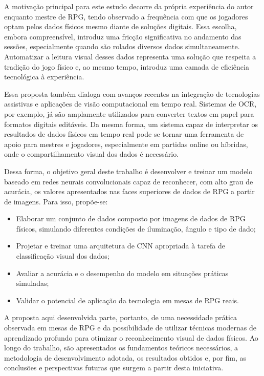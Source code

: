 A motivação principal para este estudo decorre da própria experiência do autor 
enquanto mestre de RPG, tendo observado a frequência com que os jogadores optam 
pelos dados físicos mesmo diante de soluções digitais. Essa escolha, embora compreensível, 
introduz uma fricção significativa no andamento das sessões, especialmente quando são 
rolados diversos dados simultaneamente. Automatizar a leitura visual desses dados 
representa uma solução que respeita a tradição do jogo físico e, ao mesmo tempo, 
introduz uma camada de eficiência tecnológica à experiência.

Essa proposta também dialoga com avanços recentes na integração de tecnologias 
assistivas e aplicações de visão computacional em tempo real. Sistemas de OCR, por 
exemplo, já são amplamente utilizados para converter textos em papel para formatos 
digitais editáveis. Da mesma forma, um sistema capaz de interpretar os resultados de 
dados físicos em tempo real pode se tornar uma ferramenta de apoio para mestres e 
jogadores, especialmente em partidas online ou híbridas, onde o compartilhamento 
visual dos dados é necessário.

Dessa forma, o objetivo geral deste trabalho é desenvolver e treinar um modelo baseado 
em redes neurais convolucionais capaz de reconhecer, com alto grau de acurácia, os 
valores apresentados nas faces superiores de dados de RPG a partir de imagens. 
Para isso, propõe-se:

\begin{itemize}
    \item Elaborar um conjunto de dados composto por imagens de dados de RPG físicos, 
          simulando diferentes condições de iluminação, ângulo e tipo de dado;
    \item Projetar e treinar uma arquitetura de CNN apropriada à tarefa de 
          classificação visual dos dados;
    \item Avaliar a acurácia e o desempenho do modelo em situações práticas simuladas;
    \item Validar o potencial de aplicação da tecnologia em mesas de RPG reais.
\end{itemize}

A proposta aqui desenvolvida parte, portanto, de uma necessidade prática observada 
em mesas de RPG e da possibilidade de utilizar técnicas modernas de aprendizado 
profundo para otimizar o reconhecimento visual de dados físicos. Ao longo do trabalho, 
são apresentados os fundamentos teóricos necessários, a metodologia de desenvolvimento 
adotada, os resultados obtidos e, por fim, as conclusões e perspectivas futuras que 
surgem a partir desta iniciativa.


